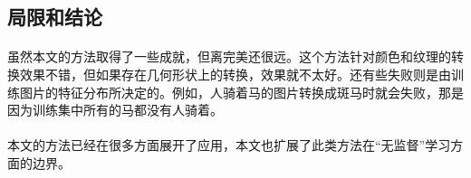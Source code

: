\documentclass[12pt,a4paper]{article}
\begin{document}
\subsection{局限和结论}
\paragraph{} 虽然本文的方法取得了一些成就，但离完美还很远。这个方法针对颜色和纹理的转换效果不错，但如果存在几何形状上的转换，效果就不太好。还有些失败则是由训练图片的特征分布所决定的。例如，人骑着马的图片转换成斑马时就会失败，那是因为训练集中所有的马都没有人骑着。
\paragraph{} 本文的方法已经在很多方面展开了应用，本文也扩展了此类方法在“无监督”学习方面的边界。


















\end{document}
